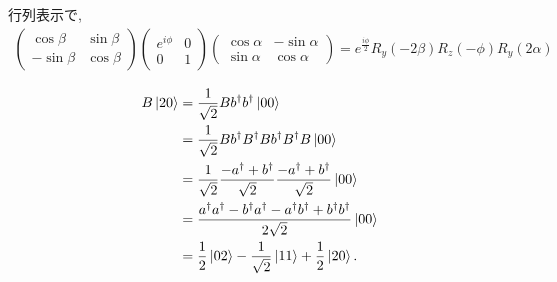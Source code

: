 \begin{ex}
    \label{ex7.10}
    行列表示で,
    \begin{align*}
        \begin{pmatrix}
            \cos \beta & \sin \beta \\
            -\sin\beta & \cos \beta
        \end{pmatrix}
        \begin{pmatrix}
            e^{i\phi} & 0 \\
            0         & 1
        \end{pmatrix}
        \begin{pmatrix}
            \cos \alpha & -\sin\alpha \\
            \sin \alpha & \cos \alpha
        \end{pmatrix}
        =
        e^{\frac{i \phi}{2}}
        R_y(-2\beta) R_z(-\phi) R_y(2\alpha)
    \end{align*}
\end{ex}

\begin{ex}
    \label{ex7.11}
    \begin{align*}
        B \ket{20}
         & =
        \frac{1}{\sqrt{2}}Bb^\dagger b^\dagger \ket{00}                                                                   \\
         & =
        \frac{1}{\sqrt{2}}Bb^\dagger B^\dagger B b^\dagger B^\dagger B \ket{00}                                           \\
         & =
        \frac{1}{\sqrt{2}}\frac{-a^\dagger + b^\dagger}{\sqrt{2}}\frac{-a^\dagger + b^\dagger}{\sqrt{2}}\ket{00}          \\
         & =
        \frac{a^\dagger a^\dagger - b^\dagger a^\dagger - a^\dagger b^\dagger + b^\dagger b^\dagger}{2 \sqrt{2}} \ket{00} \\
         & =
        \frac{1}{{2}}\ket{02} - \frac{1}{\sqrt{2}}\ket{11} + \frac{1}{{2}}\ket{20}.
    \end{align*}
\end{ex}

